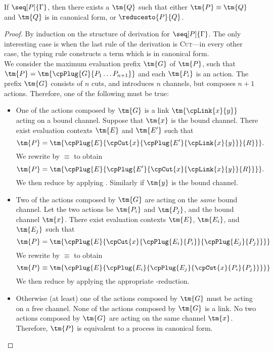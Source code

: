 \begin{theorem}[Progress]\label{thm:cp-progress}
  If $\seq[P]{\Gamma}$, then there exists a $\tm{Q}$ such that either
  $\tm{P}\equiv\tm{Q}$ and $\tm{Q}$ is in canonical form, or $\reducesto{P}{Q}$.
\end{theorem}
\begin{proof}
  By induction on the structure of derivation for $\seq[P]{\Gamma}$.
  The only interesting case is when the last rule of the derivation is
  \textsc{Cut}---in every other case, the typing rule constructs a term which is
  in canonical form.
  \\
  We consider the maximum evaluation prefix $\tm{G}$ of $\tm{P}$, such that $\tm{P}
  = \tm{\cpPlug{G}{P_1 \dots P_{n+1}}}$ and each $\tm{P_i}$ is an action.
  The prefix $\tm{G}$ consists of $n$ cuts, and introduces $n$ channels, but
  composes $n+1$ actions. Therefore, one of the following must be true:
  \begin{itemize}
  \item
    One of the actions composed by $\tm{G}$ is a link $\tm{\cpLink{x}{y}}$
    acting on a bound channel.
    Suppose that $\tm{x}$ is the bound channel.
    There exist evaluation contexts $\tm{E}$ and $\tm{E'}$ such that
    \[
      \tm{P} =
      \tm{\cpPlug{E}{\cpCut{x}{\cpPlug{E'}{\cpLink{x}{y}}}{R}}}.
    \]
    We rewrite by $\equiv$ to obtain
    \[
      \tm{P} =
      \tm{\cpPlug{E}{\cpPlug{E'}{\cpCut{x}{\cpLink{x}{y}}{R}}}}.
    \]
    We then reduce by applying .
    Similarly if $\tm{y}$ is the bound channel.
  \item
    Two of the actions composed by $\tm{G}$ are acting on the \emph{same} bound
    channel.
    Let the two actions be $\tm{P_i}$ and $\tm{P_j}$, and the bound channel
    $\tm{x}$.
    There exist evaluation contexts $\tm{E}$, $\tm{E_i}$, and $\tm{E_j}$ such
    that
    \[
      \tm{P} =
      \tm{\cpPlug{E}{\cpCut{x}{\cpPlug{E_i}{P_i}}{\cpPlug{E_j}{P_j}}}}
    \]
    We rewrite by $\equiv$ to obtain
    \[
      \tm{P} \equiv
      \tm{\cpPlug{E}{\cpPlug{E_i}{\cpPlug{E_j}{\cpCut{x}{P_i}{P_j}}}}}
    \]
    We then reduce by applying the appropriate \textbeta-reduction.
  \item
    Otherwise (at least) one of the actions composed by $\tm{G}$ must be acting
    on a free channel.
    None of the actions composed by $\tm{G}$ is a link.
    No two actions composed by $\tm{G}$ are acting on the same channel $\tm{x}$.
    Therefore, $\tm{P}$ is equivalent to a process in canonical form.
  \end{itemize}
\end{proof}
